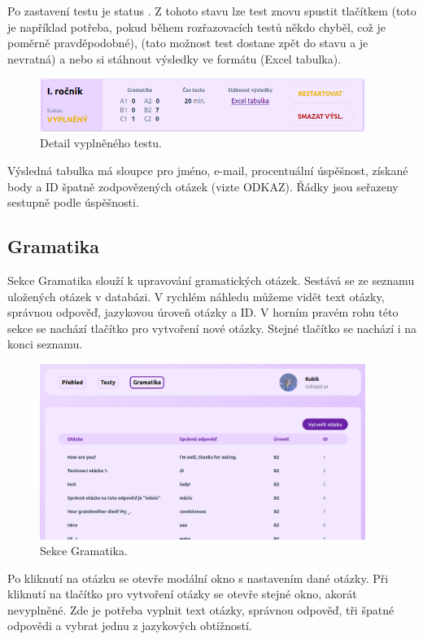 Po zastavení testu je status . Z tohoto stavu lze test znovu spustit tlačítkem  (toto je například potřeba, pokud během rozřazovacích testů někdo chyběl, což je poměrně pravděpodobné),  (tato možnost test dostane zpět do stavu  a je nevratná) a nebo si stáhnout výsledky ve formátu  (Excel tabulka).

\begin{figure}[H]
    \centering
    \includegraphics[width=400px]{images/01design/test-filled.png}
    \caption{Detail vyplněného testu.}
\end{figure}

Výsledná tabulka má sloupce pro jméno, e-mail, procentuální úspěšnost, získané body a ID špatně zodpovězených otázek (vizte ODKAZ). Řádky jsou seřazeny sestupně podle úspěšnosti.

\subsection{Gramatika}

Sekce Gramatika slouží k upravování gramatických otázek. Sestává se ze seznamu uložených otázek v databázi. V rychlém náhledu můžeme vidět text otázky, správnou odpověď, jazykovou úroveň otázky a ID. V horním pravém rohu této sekce se nachází tlačítko pro vytvoření nové otázky. Stejné tlačítko se nachází i na konci seznamu.

\begin{figure}[H]
    \centering
    \includegraphics[width=400px]{images/01design/grammar.png}
    \caption{Sekce Gramatika.}
\end{figure}

Po kliknutí na otázku se otevře modální okno s nastavením dané otázky. Při kliknutí na tlačítko pro vytvoření otázky se otevře stejné okno, akorát nevyplněné. Zde je potřeba vyplnit text otázky, správnou odpověď, tři špatné odpovědi a vybrat jednu z jazykových obtížností. 

